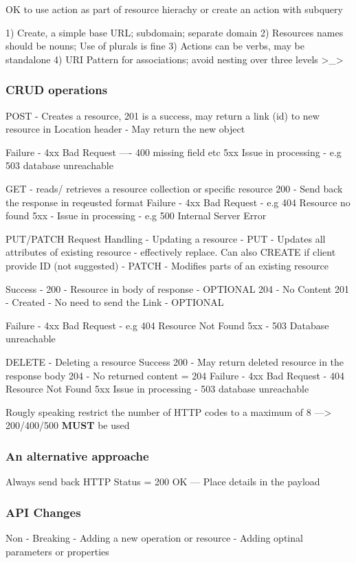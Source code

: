 \documentclass[a4paper, 11pt]{book}
\begin{document}
    OK to use action as part of resource hierachy or create an action with subquery

    1) Create, a simple base URL; subdomain; separate domain
    2) Resources names should be nouns; Use of plurals is fine
    3) Actions can be verbs, may be standalone
    4) URI Pattern for associations; avoid nesting over three levels >_>

    \subsubsection{CRUD operations}
    POST - Creates a resource,
    201 is a success, may return a link (id) to new resource in Location header
    - May return the new object

    Failure - 4xx Bad Request ---- 400 missing field etc
    5xx Issue in processing - e.g 503 database unreachable

    GET - reads/ retrieves a resource collection or specific resource
    200 - Send back the response in reqeusted format
    Failure - 4xx Bad Request - e.g 404 Resource no found
    5xx - Issue in processing - e.g 500 Internal Server Error

    PUT/PATCH Request Handling - Updating a resource
    - PUT - Updates all attributes of existing resource - effectively replace. Can also CREATE if client provide ID (not suggested)
    - PATCH - Modifies parts of an existing resource

    Success - 200 - Resource in body of response - OPTIONAL
    204 - No Content
    201 - Created - No need to send the Link - OPTIONAL

    Failure - 4xx Bad Request - e.g 404 Resource Not Found
    5xx - 503 Database unreachable

    DELETE - Deleting a resource
    Success 200 - May return deleted resource in the response body
    204 - No returned content = 204
    Failure - 4xx Bad Request - 404 Resource Not Found
    5xx Issue in processing - 503 database unreachable

    Rougly speaking restrict the number of HTTP codes to a maximum of 8
    ---> 200/400/500 \textbf{MUST} be used

    \subsubsection{An alternative approache}
    Always send back HTTP Status = 200 OK
    --- Place details in the payload

    \subsubsection{API Changes}
    Non - Breaking
    - Adding a new operation or resource
    - Adding optinal parameters or properties
\end{document}
